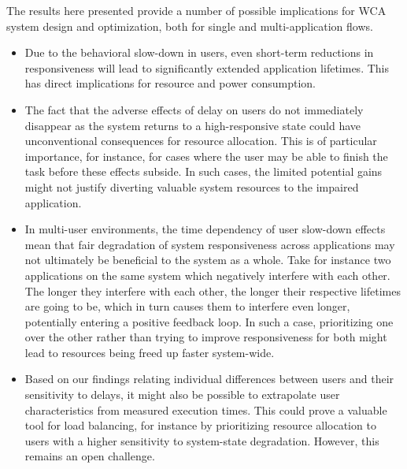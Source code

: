 The results here presented provide a number of possible implications for WCA system design and optimization, both for single and multi-application flows.

\begin{itemize}

  \item Due to the behavioral slow-down in users, even short-term reductions in responsiveness will lead to significantly extended application lifetimes.
  This has direct implications for resource and power consumption.
  
  \item The fact that the adverse effects of delay on users do not immediately disappear as the system returns to a high-responsive state could have unconventional consequences for resource allocation.
  This is of particular importance, for instance, for cases where the user may be able to finish the task before these effects subside.
  In such cases, the limited potential gains might not justify diverting valuable system resources to the impaired application.

  \item In multi-user environments, the time dependency of user slow-down effects mean that fair degradation of system responsiveness across applications may not ultimately be beneficial to the system as a whole.
  Take for instance two applications on the same system which negatively interfere with each other. 
  The longer they interfere with each other, the longer their respective lifetimes are going to be, which in turn causes them to interfere even longer, potentially entering a positive feedback loop. 
  In such a case, prioritizing one over the other rather than trying to improve responsiveness for both might lead to resources being freed up faster system-wide.

  \item Based on our findings relating individual differences between users and their sensitivity to delays, it might also be possible to extrapolate user characteristics from measured execution times.
  This could prove a valuable tool for load balancing, for instance by prioritizing resource allocation to users with a higher sensitivity to system-state degradation.
  However, this remains an open challenge.

\end{itemize}

